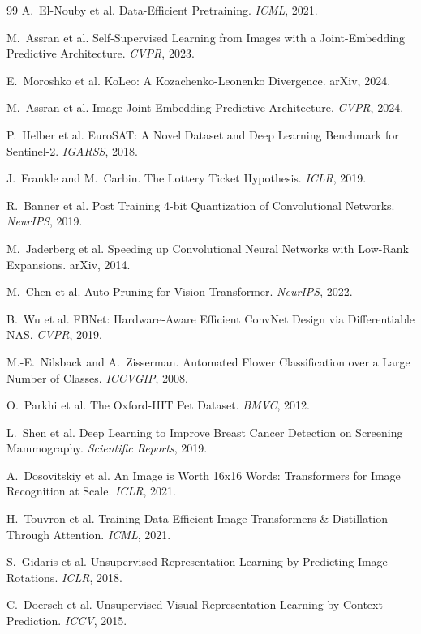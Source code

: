 \documentclass{article}
\begin{document}
\begin{thebibliography}{99}
 A.~El-Nouby et al. Data-Efficient Pretraining. \textit{ICML}, 2021.

 M.~Assran et al. Self-Supervised Learning from Images with a Joint-Embedding Predictive Architecture. \textit{CVPR}, 2023.

 E.~Moroshko et al. KoLeo: A Kozachenko-Leonenko Divergence. arXiv, 2024.

 M.~Assran et al. Image Joint-Embedding Predictive Architecture. \textit{CVPR}, 2024.

 P.~Helber et al. EuroSAT: A Novel Dataset and Deep Learning Benchmark for Sentinel-2. \textit{IGARSS}, 2018.

 J.~Frankle and M.~Carbin. The Lottery Ticket Hypothesis. \textit{ICLR}, 2019.

 R.~Banner et al. Post Training 4-bit Quantization of Convolutional Networks. \textit{NeurIPS}, 2019.

 M.~Jaderberg et al. Speeding up Convolutional Neural Networks with Low-Rank Expansions. arXiv, 2014.

 M.~Chen et al. Auto-Pruning for Vision Transformer. \textit{NeurIPS}, 2022.

 B.~Wu et al. FBNet: Hardware-Aware Efficient ConvNet Design via Differentiable NAS. \textit{CVPR}, 2019.

 M.-E.~Nilsback and A.~Zisserman. Automated Flower Classification over a Large Number of Classes. \textit{ICCVGIP}, 2008.

 O.~Parkhi et al. The Oxford-IIIT Pet Dataset. \textit{BMVC}, 2012.

 L.~Shen et al. Deep Learning to Improve Breast Cancer Detection on Screening Mammography. \textit{Scientific Reports}, 2019.

 A.~Dosovitskiy et al. An Image is Worth 16x16 Words: Transformers for Image Recognition at Scale. \textit{ICLR}, 2021.

 H.~Touvron et al. Training Data-Efficient Image Transformers \& Distillation Through Attention. \textit{ICML}, 2021.

 S.~Gidaris et al. Unsupervised Representation Learning by Predicting Image Rotations. \textit{ICLR}, 2018.

 C.~Doersch et al. Unsupervised Visual Representation Learning by Context Prediction. \textit{ICCV}, 2015.


\end{thebibliography}
\end{document}

